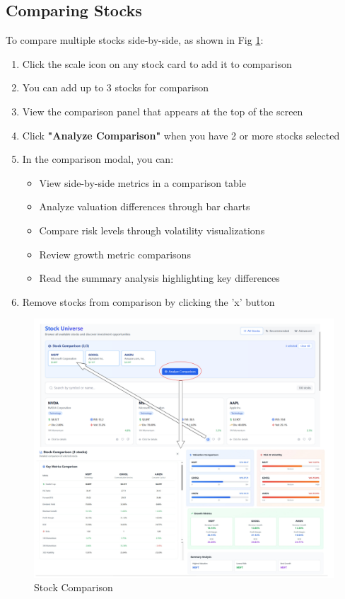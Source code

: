 \subsection{Comparing Stocks}
To compare multiple stocks side-by-side, as shown in Fig \ref{fig:stock_comparison}:

\begin{enumerate}
    \item Click the scale icon on any stock card to add it to comparison
    \item You can add up to 3 stocks for comparison
    \item View the comparison panel that appears at the top of the screen
    \item Click \textbf{"Analyze Comparison"} when you have 2 or more stocks selected
    \item In the comparison modal, you can:
    \begin{itemize}
        \item View side-by-side metrics in a comparison table
        \item Analyze valuation differences through bar charts
        \item Compare risk levels through volatility visualizations
        \item Review growth metric comparisons
        \item Read the summary analysis highlighting key differences
    \end{itemize}
    \item Remove stocks from comparison by clicking the 'x' button
\end{enumerate}
\begin{figure}[H]
    \centering
    \includegraphics[width=1\linewidth]{images/stock_recommend/user_guide/compare.png}
    \caption{Stock Comparison}
    \label{fig:stock_comparison}
\end{figure}


